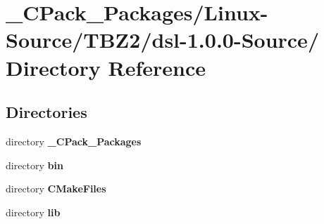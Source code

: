 \section{\_\-CPack\_\-Packages/Linux-\/Source/TBZ2/dsl-\/1.0.0-\/Source/ Directory Reference}
\label{dir_c725755bf0ef60f938e64ea1c8e39826}
\subsection*{Directories}
\begin{DoxyCompactItemize}
\item 
directory {\bf \_\-CPack\_\-Packages}
\item 
directory {\bf bin}
\item 
directory {\bf CMakeFiles}
\item 
directory {\bf lib}
\end{DoxyCompactItemize}
